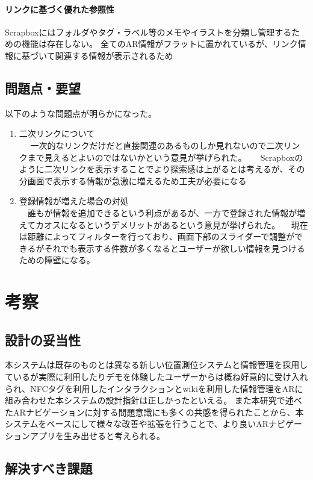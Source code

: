 \paragraph*{リンクに基づく優れた参照性}
Scrapboxにはフォルダやタグ・ラベル等のメモやイラストを分類し管理するための機能は存在しない。
全てのAR情報がフラットに置かれているが、リンク情報に基づいて関連する情報が表示されるため



\subsection{問題点・要望}
以下のような問題点が明らかになった。
\begin{enumerate}
  \item 二次リンクについて\\
　 一次的なリンクだけだと直接関連のあるものしか見れないので二次リンクまで見えるとよいのではないかという意見が挙げられた。
　 Scrapboxのように二次リンクを表示することでより探索感は上がるとは考えるが、その分画面で表示する情報が急激に増えるため工夫が必要になる
  \item 登録情報が増えた場合の対処\\
 　誰もが情報を追加できるという利点があるが、一方で登録された情報が増えてカオスになるというデメリットがあるという意見が挙げられた。
 　現在は距離によってフィルターを行っており、画面下部のスライダーで調整ができるがそれでも表示する件数が多くなるとユーザーが欲しい情報を見つけるための障壁になる。
\end{enumerate}


\section{考察}

\subsection{設計の妥当性}
本システムは既存のものとは異なる新しい位置測位システムと情報管理を採用しているが実際に利用したりデモを体験したユーザーからは概ね好意的に受け入れられ、NFCタグを利用したインタラクションとwikiを利用した情報管理をARに組み合わせた本システムの設計指針は正しかったといえる。
また本研究で述べたARナビゲーションに対する問題意識にも多くの共感を得られたことから、本システムをベースにして様々な改善や拡張を行うことで、より良いARナビゲーションアプリを生み出せると考えられる。

\subsection{解決すべき課題}

